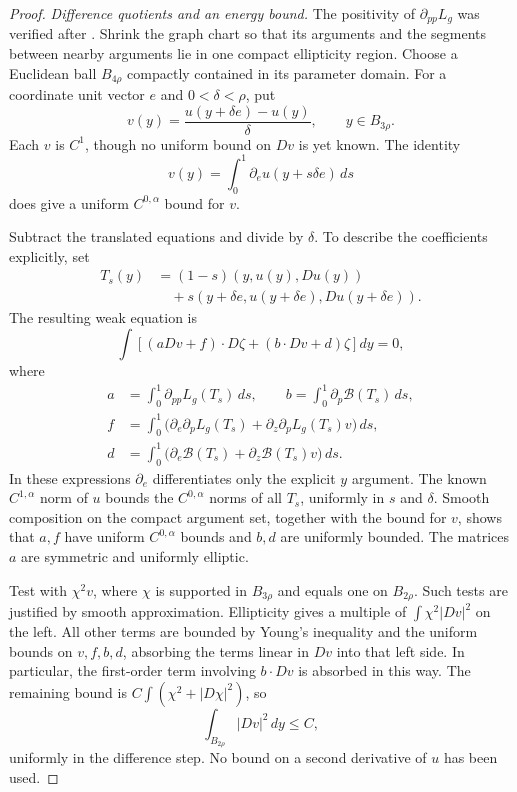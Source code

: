 \begin{proof}
\emph{Difference quotients and an energy bound.}
The positivity of $\partial_{pp}L_g$ was verified after
. Shrink the graph chart so that
its arguments and the segments between nearby arguments lie in one
compact ellipticity region. Choose a Euclidean
ball $B_{4\rho}$ compactly contained in its parameter
domain. For a coordinate unit vector $e$ and $0<\delta<\rho$, put
\[
 v(y)=\frac{u(y+\delta e)-u(y)}{\delta},
 \qquad y\in B_{3\rho}.
\]
Each $v$ is $C^1$, though no uniform bound on $Dv$ is yet known.
The identity
\[
 v(y)=\int_0^1\partial_eu(y+s\delta e)\,ds
\]
does give a uniform $C^{0,\alpha}$ bound for $v$.

Subtract the translated equations and divide by $\delta$. To
describe the coefficients explicitly, set
\[
 \begin{aligned}
 T_s(y)&=(1-s)(y,u(y),Du(y))\\
       &\quad+s(y+\delta e,u(y+\delta e),Du(y+\delta e)).
 \end{aligned}
\]
The resulting weak equation is
\begin{equation}
\label{eq:equality-quotient-equation}
 \int\left[(aDv+f)\cdot D\zeta
              +(b\cdot Dv+d)\zeta\right]dy=0,
\end{equation}
where
\begin{align*}
 a&=\int_0^1\partial_{pp}L_g(T_s)\,ds,
 \qquad b=\int_0^1\partial_p\mathcal B(T_s)\,ds,\\
 f&=\int_0^1
       \bigl(\partial_e\partial_pL_g(T_s)
             +\partial_z\partial_pL_g(T_s)v\bigr)\,ds,\\
 d&=\int_0^1
       \bigl(\partial_e\mathcal B(T_s)
             +\partial_z\mathcal B(T_s)v\bigr)\,ds.
\end{align*}
In these expressions $\partial_e$ differentiates only the explicit
$y$ argument. The known $C^{1,\alpha}$ norm of $u$ bounds the
$C^{0,\alpha}$ norms of all $T_s$, uniformly in $s$ and $\delta$.
Smooth composition on the compact argument set, together with the
bound for $v$, shows that $a,f$ have uniform $C^{0,\alpha}$ bounds
and $b,d$ are uniformly bounded. The matrices $a$ are symmetric and
uniformly elliptic.

Test  with $\chi^2v$, where
$\chi$ is supported in $B_{3\rho}$ and equals one on $B_{2\rho}$.
Such tests are justified by smooth approximation. Ellipticity gives
a multiple of $\int\chi^2|Dv|^2$ on the left. All other terms are
bounded by Young's inequality and the uniform bounds on
$v,f,b,d$, absorbing the terms linear in $Dv$ into that left side.
In particular, the first-order term involving $b\cdot Dv$ is
absorbed in this way. The remaining bound is
$C\int(\chi^2+|D\chi|^2)$, so
\begin{equation}
\label{eq:equality-quotient-energy}
 \int_{B_{2\rho}}|Dv|^2\,dy\le C,
\end{equation}
uniformly in the difference step. No bound on a second derivative of
$u$ has been used.


\end{proof}

